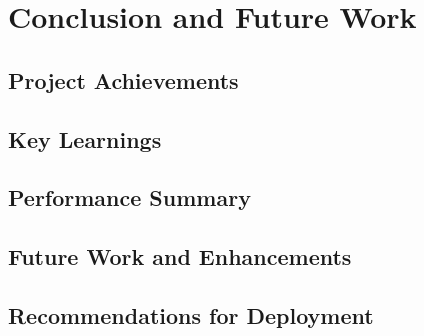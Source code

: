\chapter{Conclusion and Future Work}

\section{Project Achievements}

\section{Key Learnings}

\section{Performance Summary}

\section{Future Work and Enhancements}

\section{Recommendations for Deployment}
